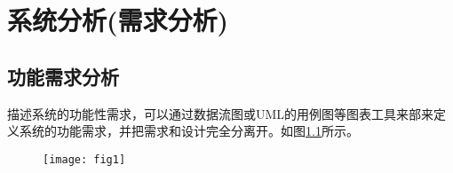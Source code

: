 

\chapter{系统分析(需求分析)}

\section{功能需求分析}
描述系统的功能性需求，可以通过数据流图或UML的用例图等图表工具来部来定义系统的功能需求，并把需求和设计完全分离开。如图\ref{fig:single}所示。




\begin{figure}[H]
	\centering 
	\texttt{[image: fig1]} 
	\label{fig:single}
\end{figure}


 
 


 
